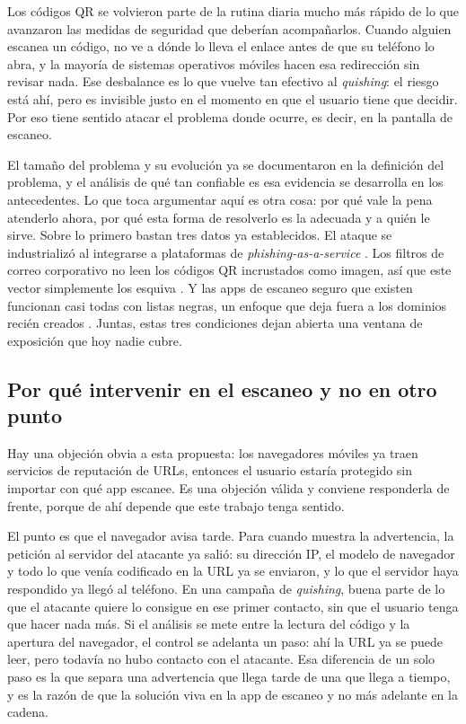 Los códigos QR se volvieron parte de la rutina diaria mucho más rápido de lo que
avanzaron las medidas de seguridad que deberían acompañarlos. Cuando alguien escanea
un código, no ve a dónde lo lleva el enlace antes de que su teléfono lo abra, y la
mayoría de sistemas operativos móviles hacen esa redirección sin revisar nada. Ese
desbalance es lo que vuelve tan efectivo al \emph{quishing}: el riesgo está ahí, pero
es invisible justo en el momento en que el usuario tiene que decidir. Por eso tiene
sentido atacar el problema donde ocurre, es decir, en la pantalla de escaneo.

El tamaño del problema y su evolución ya se documentaron en la definición del
problema, y el análisis de qué tan confiable es esa evidencia se desarrolla en los
antecedentes. Lo que toca argumentar aquí es otra cosa: por qué vale la pena
atenderlo ahora, por qué esta forma de resolverlo es la adecuada y a quién le sirve.
Sobre lo primero bastan tres datos ya establecidos. El ataque se industrializó al
integrarse a plataformas de \emph{phishing-as-a-service} \cite{insikt2024qrcode}. Los
filtros de correo corporativo no leen los códigos QR incrustados como imagen, así que
este vector simplemente los esquiva \cite{unit42_2023qr}. Y las apps de escaneo
seguro que existen funcionan casi todas con listas negras, un enfoque que deja fuera
a los dominios recién creados
\cite{sheng2009empirical,ma2009beyond,apwg2024q1,apwg2025q1}. Juntas, estas tres
condiciones dejan abierta una ventana de exposición que hoy nadie cubre.

\subsection*{Por qué intervenir en el escaneo y no en otro punto}

Hay una objeción obvia a esta propuesta: los navegadores móviles ya traen servicios
de reputación de URLs, entonces el usuario estaría protegido sin importar con qué app
escanee. Es una objeción válida y conviene responderla de frente, porque de ahí
depende que este trabajo tenga sentido.

El punto es que el navegador avisa tarde. Para cuando muestra la advertencia, la
petición al servidor del atacante ya salió: su dirección IP, el modelo de navegador y
todo lo que venía codificado en la URL ya se enviaron, y lo que el servidor haya
respondido ya llegó al teléfono. En una campaña de \emph{quishing}, buena parte de lo
que el atacante quiere lo consigue en ese primer contacto, sin que el usuario tenga
que hacer nada más. Si el análisis se mete entre la lectura del código y la apertura
del navegador, el control se adelanta un paso: ahí la URL ya se puede leer, pero
todavía no hubo contacto con el atacante. Esa diferencia de un solo paso es la que
separa una advertencia que llega tarde de una que llega a tiempo, y es la razón de
que la solución viva en la app de escaneo y no más adelante en la cadena.

